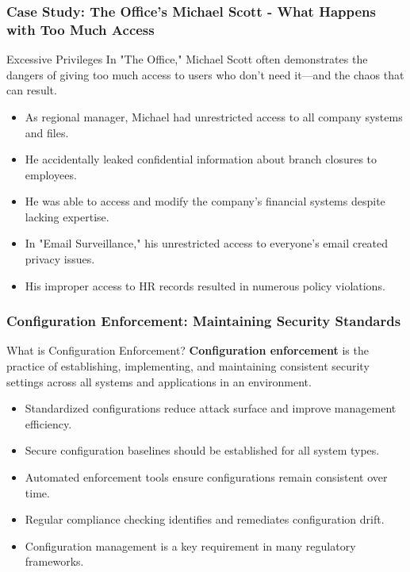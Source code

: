 \documentclass{beamer}
\begin{document}
    \begin{frame}
    \frametitle{Case Study: The Office's Michael Scott - What Happens with Too Much Access}
    
    \begin{exampleblock}{Excessive Privileges}
    In "The Office," Michael Scott often demonstrates the dangers of giving too much access to users who don't need it—and the chaos that can result.
    \end{exampleblock}
    
    \begin{itemize}
    \item As regional manager, Michael had unrestricted access to all company systems and files.
    \item He accidentally leaked confidential information about branch closures to employees.
    \item He was able to access and modify the company's financial systems despite lacking expertise.
    \item In "Email Surveillance," his unrestricted access to everyone's email created privacy issues.
    \item His improper access to HR records resulted in numerous policy violations.
    \end{itemize}
    
    \end{frame}

\begin{frame}
    \frametitle{Configuration Enforcement: Maintaining Security Standards}
    
    \begin{block}{What is Configuration Enforcement?}
    \textbf{Configuration enforcement} is the practice of establishing, implementing, and maintaining consistent security settings across all systems and applications in an environment.
    \end{block}
    
    \begin{itemize}
    \item Standardized configurations reduce attack surface and improve management efficiency.
    \item Secure configuration baselines should be established for all system types.
    \item Automated enforcement tools ensure configurations remain consistent over time.
    \item Regular compliance checking identifies and remediates configuration drift.
    \item Configuration management is a key requirement in many regulatory frameworks.
    \end{itemize}
    
    \end{frame}
\end{document}
